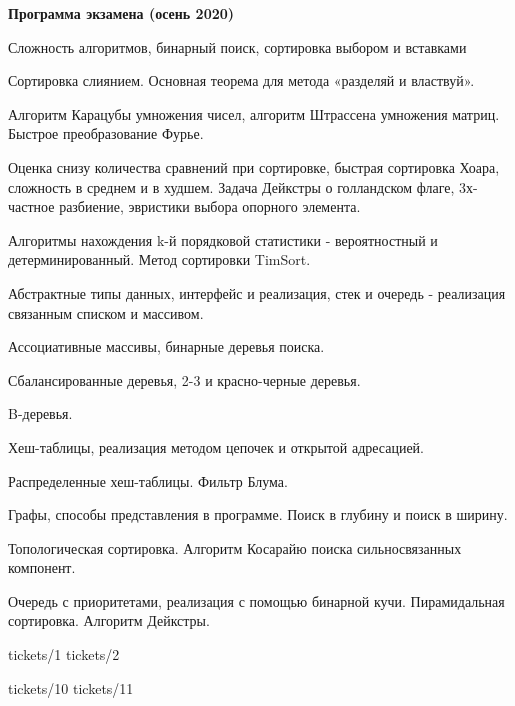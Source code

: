 \documentclass[specialist, subf, href, colorlinks=true, 12pt, times, mtpro, final]{disser}
\begin{document}
\tableofcontents

\newpage
{\Large \bf Программа экзамена (осень 2020)}

\begin{enumerate}
{\footnotesize
\item Сложность алгоритмов, бинарный поиск, сортировка выбором и вставками
\item Сортировка слиянием. Основная теорема для метода «разделяй и властвуй».
\item Алгоритм Карацубы умножения чисел, алгоритм Штрассена умножения матриц. Быстрое преобразование Фурье.
\item Оценка снизу количества сравнений при сортировке, быстрая сортировка Хоара, сложность в среднем и в худшем. Задача Дейкстры о голландском флаге, 3х-частное разбиение, эвристики выбора опорного элемента.
\item Алгоритмы нахождения k-й порядковой статистики - вероятностный и детерминированный. Метод сортировки TimSort.
\item Абстрактные типы данных, интерфейс и реализация, стек и очередь - реализация связанным списком и массивом.
\item Ассоциативные массивы, бинарные деревья поиска.
\item Сбалансированные деревья, 2-3 и красно-черные деревья.
\item B-деревья.
\item Хеш-таблицы, реализация методом цепочек и открытой адресацией.
\item Распределенные хеш-таблицы. Фильтр Блума.
\item Графы, способы представления в программе. Поиск в глубину и поиск в ширину.
\item Топологическая сортировка. Алгоритм Косарайю поиска сильносвязанных компонент.
\item Очередь с приоритетами, реализация с помощью бинарной кучи. Пирамидальная сортировка. Алгоритм Дейкстры.
}
\end{enumerate}

 {tickets/1}
 {tickets/2}

 {tickets/10}
 {tickets/11}
 
\end{document}
